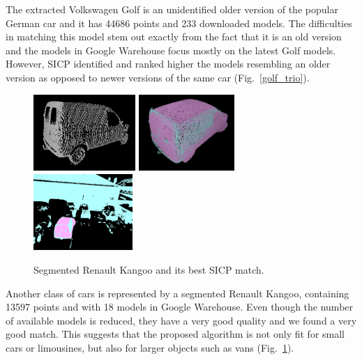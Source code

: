 \documentclass{llncs}
\begin{document}
The extracted Volkswagen Golf is an unidentified older version of the
popular German car and it has 44686 points and 233 downloaded
models. The difficulties in matching this model stem out exactly from
the fact that it is an old version and the models in Google Warehouse
focus mostly on the latest Golf models. However, SICP identified and
ranked higher the models resembling an older version as opposed to
newer versions of the same car (Fig.~\ref{golf_trio}).
 
  \begin{figure}
    \centering
    \includegraphics[height=29mm]{chapter5_pictures/Renault}
    \hfill
    \includegraphics[height=29mm]{chapter5_pictures/Renault_matched}
    \hfill
    \includegraphics[height=29mm]{chapter5_pictures/Renault_matched_scan}
    \caption{Segmented Renault Kangoo and its best SICP match.}
    \label{renault_trio}
  \end{figure}

Another class of cars is represented by a segmented Renault Kangoo,
containing 13597 points and with 18 models in Google Warehouse. Even
though the number of available models is reduced, they have a very
good quality and we found a very good match. This suggests that the
proposed algorithm is not only fit for small cars or limousines, but
also for larger objects such as vans (Fig.~\ref{renault_trio}).
\end{document}
